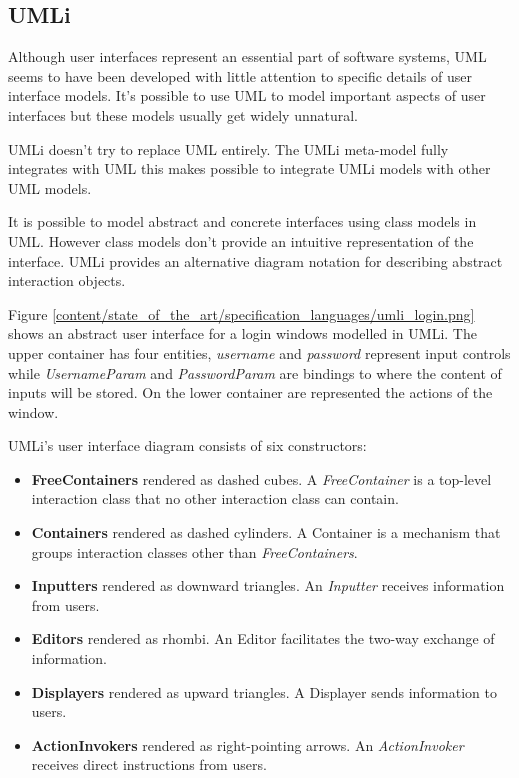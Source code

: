 \subsection{UMLi}
\label{subsection:umli}

Although user interfaces represent an essential part of software systems, UML seems to have been developed with little attention to specific details of user interface models. It's possible to use UML to model important aspects of user interfaces but these models usually get widely unnatural.

UMLi\cite{User_Interface_Modeling_in_UMLi} doesn't try to replace UML entirely. The UMLi meta-model fully integrates with UML this makes possible to integrate UMLi models with other UML models.

It is possible to model abstract and concrete interfaces using class models in UML. However class models don't provide an intuitive representation of the interface. UMLi provides an alternative
diagram notation for describing abstract interaction objects.


Figure \ref{content/state_of_the_art/specification_languages/umli_login.png} shows an abstract user interface for a login windows modelled in UMLi. The upper container has four entities, \textit{username} and \textit{password} represent input controls while \textit{UsernameParam} and \textit{PasswordParam} are bindings to where the content of inputs will be stored. On the lower container are represented the actions of the window.

UMLi's user interface diagram consists of six constructors:
\begin{itemize}
\item \textbf{FreeContainers} rendered as dashed cubes. A \textit{FreeContainer} is a top-level interaction class that no other interaction class can contain.

\item \textbf{Containers} rendered as dashed cylinders. A Container is a mechanism that groups interaction classes other than \textit{FreeContainers}.

\item \textbf{Inputters} rendered as downward triangles. An \textit{Inputter} receives information from users.

\item \textbf{Editors} rendered as rhombi. An Editor facilitates the two-way exchange of information.

\item \textbf{Displayers} rendered as upward triangles. A Displayer sends information to users.

\item \textbf{ActionInvokers} rendered as right-pointing arrows. An \textit{ActionInvoker} receives direct instructions from users.
\end{itemize}

